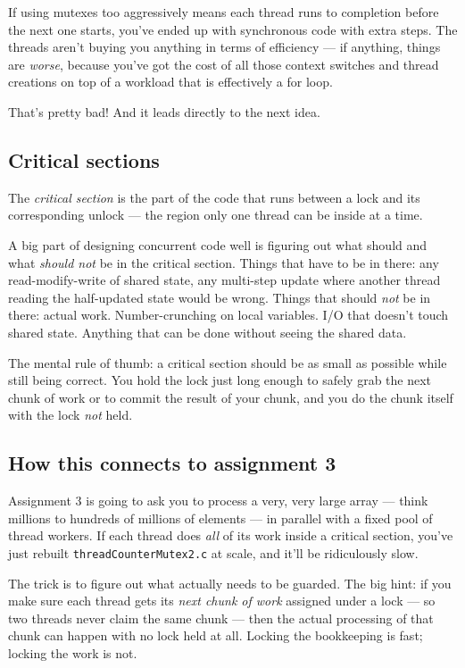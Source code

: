 \documentclass[11pt]{article}
\begin{document}
If using mutexes too aggressively means each thread runs to
completion before the next one starts, you've ended up with
synchronous code with extra steps. The threads aren't buying you
anything in terms of efficiency --- if anything, things are
\emph{worse}, because you've got the cost of all those context
switches and thread creations on top of a workload that is
effectively a for loop.

That's pretty bad! And it leads directly to the next idea.

\subsection*{Critical sections}

The \emph{critical section} is the part of the code that runs between
a lock and its corresponding unlock --- the region only one thread can
be inside at a time.

A big part of designing concurrent code well is figuring out what
should and what \emph{should not} be in the critical section. Things
that have to be in there: any read-modify-write of shared state, any
multi-step update where another thread reading the half-updated state
would be wrong. Things that should \emph{not} be in there: actual
work. Number-crunching on local variables. I/O that doesn't touch
shared state. Anything that can be done without seeing the shared
data.

The mental rule of thumb: a critical section should be as small as
possible while still being correct. You hold the lock just long enough
to safely grab the next chunk of work or to commit the result of your
chunk, and you do the chunk itself with the lock \emph{not} held.

\subsection*{How this connects to assignment 3}

Assignment 3 is going to ask you to process a very, very large array
--- think millions to hundreds of millions of elements --- in parallel
with a fixed pool of thread workers. If each thread does \emph{all} of
its work inside a critical section, you've just rebuilt
\texttt{threadCounterMutex2.c} at scale, and it'll be ridiculously
slow.

The trick is to figure out what actually needs to be guarded. The big
hint: if you make sure each thread gets its \emph{next chunk of work}
assigned under a lock --- so two threads never claim the same chunk
--- then the actual processing of that chunk can happen with no lock
held at all. Locking the bookkeeping is fast; locking the work is
not.
\end{document}
